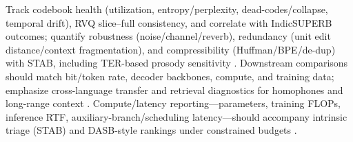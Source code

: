 \documentclass{article}
\begin{document}
Track codebook health (utilization, entropy/perplexity, dead-codes/collapse, temporal drift), RVQ slice--full consistency, and correlate with IndicSUPERB outcomes; quantify robustness (noise/channel/reverb), redundancy (unit edit distance/context fragmentation), and compressibility (Huffman/BPE/de-dup) with STAB, including TER-based prosody sensitivity \cite{vashishth2024stabspeechtokenizerassessmentbenchmark,entry2025indicsuperbspeechprocessinguniversalperf,onda2025benchmarkingprosodyencodingdiscretespeec}. Downstream comparisons should match bit/token rate, decoder backbones, compute, and training data; emphasize cross-language transfer and retrieval diagnostics for homophones and long-range context \cite{har-tuv2025pastphoneticacousticspeechtokenizer,min2025speechretrievalaugmentedgenerationwithou,entry2025indicsuperbspeechprocessinguniversalperf}. Compute/latency reporting---parameters, training FLOPs, inference RTF, auxiliary-branch/scheduling latency---should accompany intrinsic triage (STAB) and DASB-style rankings under constrained budgets \cite{maimon2025scalinganalysisinterleavedspeechtextlang,mousavi2024dasbdiscreteaudiospeechbenchmark,vashishth2024stabspeechtokenizerassessmentbenchmark,maimon2025salmonsuiteacousticlanguagemodelevaluati,chen2023reducingbarriersselfsupervisedlearninghu}.
\end{document}
